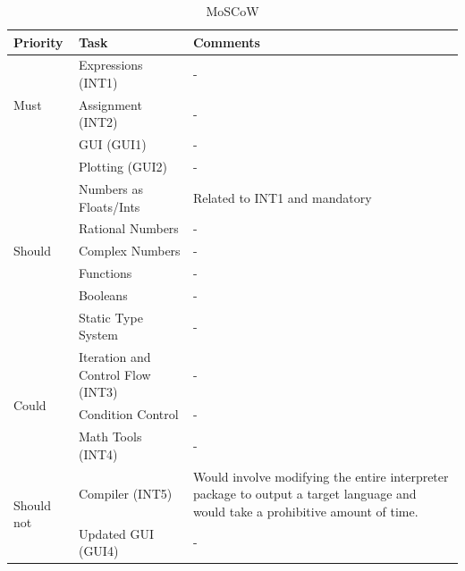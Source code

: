 \documentclass[a4paper, oneside, 11pt]{report}
\begin{document}
    \begin{table}[h]
        \caption{MoSCoW}
        \begin{center}
            \begin{tabular}{|p{1in}|p{2in}|p{2.5in}|} \hline
            Priority & Task & Comments \\ \hline \hline

            \multirow{3}{1in}{Must}
            & Expressions (INT1) & - \\ \cline{2-3}
            & Assignment (INT2) & - \\ \cline{2-3}
            & GUI (GUI1) & - \\ \cline{2-3}
            & Plotting (GUI2) & - \\ \cline{2-3}
            & Numbers as Floats/Ints & Related to INT1 and mandatory \\ \hline \hline

            \multirow{3}{1in}{Should}
            & Rational Numbers & - \\ \cline{2-3}
            & Complex Numbers & - \\ \cline{2-3}
            & Functions & - \\ \cline{2-3}
            & Booleans & - \\ \cline{2-3}
            & Static Type System & - \\ \hline \hline

            \multirow{3}{1in}{Could}
            & Iteration and Control Flow (INT3) & - \\ \cline{2-3}
            & Condition Control & - \\ \cline{2-3}
            & Math Tools (INT4) & - \\ \hline \hline

            \multirow{3}{1in}{Should not}
            & Compiler (INT5) & Would involve modifying the entire interpreter package to output a target language and would take a prohibitive amount of time. \\ \cline{2-3}
            & Updated GUI (GUI4) & - \\ \hline
            \end{tabular}
            \label{Table1}
        \end{center}
    \end{table}

\end{document}

